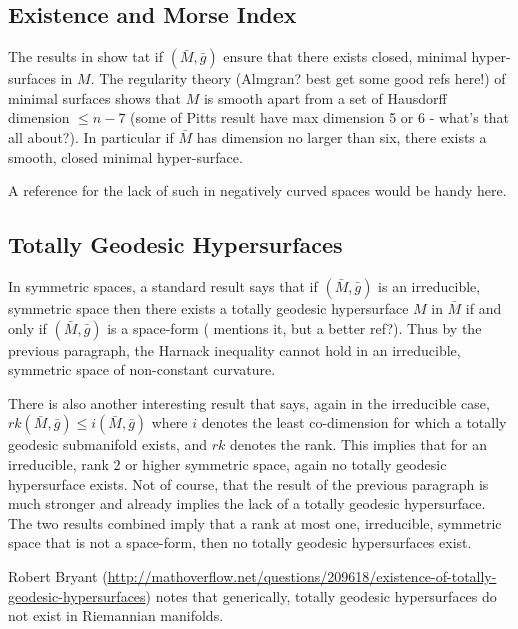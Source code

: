 \documentclass{amsart}
\begin{document}
\subsection{Existence and Morse Index}
\label{subsec:existence_index}

The results in \cite{pitts:/1976,pitts:/1981,pitts:/1983,SchoenSimon:/1981} show tat if \((\bar{M}, \bar{g})\) ensure that there exists closed, minimal hyper-surfaces in \(M\). The regularity theory (Almgran? best get some good refs here!) of minimal surfaces shows that \(M\) is smooth apart from a set of Hausdorff dimension \(\leq n-7\) (some of Pitts result have max dimension 5 or 6 - what's that all about?). In particular if \(\bar{M}\) has dimension no larger than six, there exists a smooth, closed minimal hyper-surface.

A reference for the lack of such in negatively curved spaces would be handy here.

\subsection{Totally Geodesic Hypersurfaces}
\label{subsec:totally_geodesic}

In symmetric spaces, a standard result says that if \((\bar{M}, \bar{g})\) is an irreducible, symmetric space then there exists a totally geodesic hypersurface \(M\) in \(\bar{M}\) if and only if \((\bar{M}, \bar{g})\) is a space-form (\cite{BenrdtOlmos:/2014} mentions it, but a better ref?). Thus by the previous paragraph, the Harnack inequality cannot hold in an irreducible, symmetric space of non-constant curvature.

There is also another interesting result \cite{BenrdtOlmos:/2014} that says, again in the irreducible case, \(rk(\bar{M}, \bar{g}) \leq i(\bar{M}, \bar{g})\) where \(i\) denotes the least co-dimension for which a totally geodesic submanifold exists, and \(rk\) denotes the rank. This implies that for an irreducible, rank 2 or higher symmetric space, again no totally geodesic hypersurface exists. Not of course, that the result of the previous paragraph is much stronger and already implies the lack of a totally geodesic hypersurface. The two results combined imply that a rank at most one, irreducible, symmetric space that is not a space-form, then no totally geodesic hypersurfaces exist.

Robert Bryant (\url{http://mathoverflow.net/questions/209618/existence-of-totally-geodesic-hypersurfaces}) notes that generically, totally geodesic hypersurfaces do not exist in Riemannian manifolds.
\end{document}
